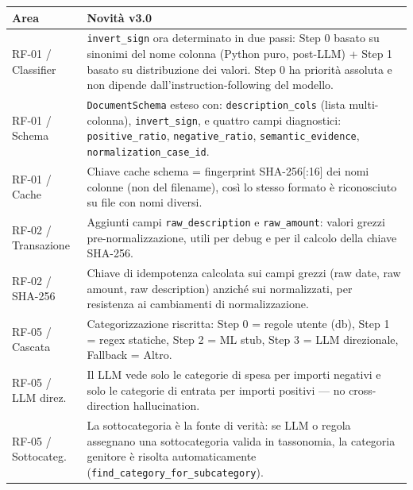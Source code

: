 \documentclass[11pt, a4paper]{article}
\begin{document}
\begin{center}
\small
\begin{longtable}{@{}L{3cm} L{10.5cm}@{}}
\toprule
\textbf{Area} & \textbf{Novità v3.0} \\
\midrule
\endhead
RF-01 / Classifier  & \texttt{invert\_sign} ora determinato in due passi: Step 0 basato su
                       sinonimi del nome colonna (Python puro, post-LLM) + Step 1 basato
                       su distribuzione dei valori. Step 0 ha priorità assoluta e non
                       dipende dall'instruction-following del modello. \\[3pt]
RF-01 / Schema      & \texttt{DocumentSchema} esteso con: \texttt{description\_cols}
                       (lista multi-colonna), \texttt{invert\_sign}, e quattro campi
                       diagnostici: \texttt{positive\_ratio}, \texttt{negative\_ratio},
                       \texttt{semantic\_evidence}, \texttt{normalization\_case\_id}. \\[3pt]
RF-01 / Cache       & Chiave cache schema = fingerprint SHA-256[:16] dei nomi colonne
                       (non del filename), così lo stesso formato è riconosciuto su file
                       con nomi diversi. \\[3pt]
RF-02 / Transazione & Aggiunti campi \texttt{raw\_description} e \texttt{raw\_amount}:
                       valori grezzi pre-normalizzazione, utili per debug e per il calcolo
                       della chiave SHA-256. \\[3pt]
RF-02 / SHA-256     & Chiave di idempotenza calcolata sui campi grezzi
                       (raw date, raw amount, raw description) anziché sui normalizzati,
                       per resistenza ai cambiamenti di normalizzazione. \\[3pt]
RF-05 / Cascata     & Categorizzazione riscritta: Step 0 = regole utente (db), Step 1 =
                       regex statiche, Step 2 = ML stub, Step 3 = LLM direzionale,
                       Fallback = Altro. \\[3pt]
RF-05 / LLM direz.  & Il LLM vede solo le categorie di spesa per importi negativi e solo
                       le categorie di entrata per importi positivi --- no cross-direction
                       hallucination. \\[3pt]
RF-05 / Sottocateg. & La sottocategoria è la fonte di verità: se LLM o regola assegnano
                       una sottocategoria valida in tassonomia, la categoria genitore è
                       risolta automaticamente (\texttt{find\_category\_for\_subcategory}). \\[3pt]

\end{longtable}
\end{center}
\end{document}

